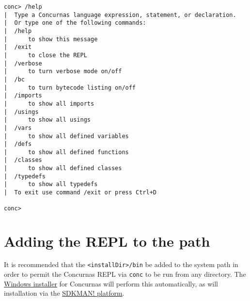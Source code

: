 \documentclass[conc-doc]{subfiles}
\begin{document}
\begin{lstlisting}[language=None]
conc> /help
|  Type a Concurnas language expression, statement, or declaration.
|  Or type one of the following commands:
|  /help
|      to show this message
|  /exit
|      to close the REPL
|  /verbose
|      to turn verbose mode on/off
|  /bc
|      to turn bytecode listing on/off
|  /imports
|      to show all imports
|  /usings
|      to show all usings
|  /vars
|      to show all defined variables
|  /defs
|      to show all defined functions
|  /classes
|      to show all defined classes
|  /typedefs
|      to show all typedefs
|  To exit use command /exit or press Ctrl+D

conc>
\end{lstlisting}

\section{Adding the REPL to the path}
It is recommended that the \lstinline[language=None]{<installDir>/bin} be added to the system path in order to permit the Concurnas REPL via \lstinline[language=None]{conc} to be run from any directory. The \href{https://concurnas.com/download.html}{Windows installer} for Concurnas will perform this automatically, as will installation via the \href{https://sdkman.io/sdks#concurnas}{SDKMAN! platform}.
	
\end{document}
